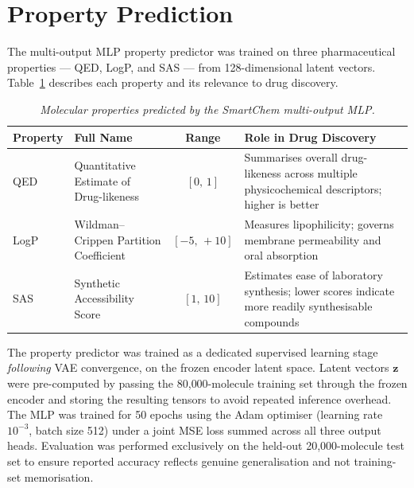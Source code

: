 \documentclass[12pt,a4paper]{report}
\begin{document}
\bigskip

\section{Property Prediction}

The multi-output MLP property predictor was trained on three pharmaceutical properties — QED, LogP, and SAS — from 128-dimensional latent vectors. Table~\ref{tab:property_predictor} describes each property and its relevance to drug discovery.

\begin{table}[htbp]
\centering
\caption{\textit{Molecular properties predicted by the SmartChem multi-output MLP.}}
\label{tab:property_predictor}
\begin{tabular}{lp{4.3cm}cp{4.8cm}}
\hline
\textbf{Property} & \textbf{Full Name} & \textbf{Range} & \textbf{Role in Drug Discovery} \\
\hline
QED  & Quantitative Estimate of Drug-likeness & $[0,\, 1]$     & Summarises overall drug-likeness across multiple physicochemical descriptors; higher is better \\[4pt]
LogP & Wildman--Crippen Partition Coefficient  & $[-5,\, +10]$  & Measures lipophilicity; governs membrane permeability and oral absorption \\[4pt]
SAS  & Synthetic Accessibility Score           & $[1,\, 10]$    & Estimates ease of laboratory synthesis; lower scores indicate more readily synthesisable compounds \\
\hline
\end{tabular}
\end{table}

The property predictor was trained as a dedicated supervised learning stage \textit{following} VAE convergence, on the frozen encoder latent space. Latent vectors $\mathbf{z}$ were pre-computed by passing the 80{,}000-molecule training set through the frozen encoder and storing the resulting tensors to avoid repeated inference overhead. The MLP was trained for 50 epochs using the Adam optimiser (learning rate $10^{-3}$, batch size 512) under a joint MSE loss summed across all three output heads. Evaluation was performed exclusively on the held-out 20{,}000-molecule test set to ensure reported accuracy reflects genuine generalisation and not training-set memorisation.\\
\end{document}

